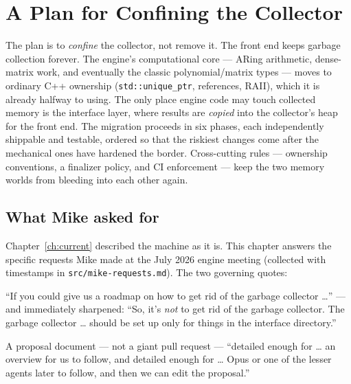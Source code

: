 \documentclass[11pt,oneside]{report}
\newcommand{\code}[1]{\textcolor{m2code}{\texttt{#1}}}
\newcommand{\file}[1]{\textcolor{m2file}{\texttt{#1}}}
\begin{document}
\chapter{A Plan for Confining the Collector}
\label{ch:plan}
\begin{inbrief}
The plan is to \emph{confine} the collector, not remove it. The front end
keeps garbage collection forever. The engine's computational core ---
ARing arithmetic, dense-matrix work, and eventually the classic
polynomial/matrix types --- moves to ordinary C++ ownership
(\code{std::unique\_ptr}, references, RAII), which it is already halfway to
using. The only place engine code may touch collected memory is the interface
layer, where results are \emph{copied} into the collector's heap for the front
end. The migration proceeds in six phases, each independently shippable and
testable, ordered so that the riskiest changes come after the mechanical ones
have hardened the border. Cross-cutting rules --- ownership conventions,
a finalizer policy, and CI enforcement --- keep the two memory worlds from
bleeding into each other again.
\end{inbrief}

\section{What Mike asked for}
\label{sec:asked}

Chapter~\ref{ch:current} described the machine as it is. This chapter answers
the specific requests Mike made at the July 2026 engine meeting (collected
with timestamps in \file{src/mike-requests.md}). The two governing quotes:

\begin{mikesays}
``If you could give us a roadmap on how to get rid of the garbage collector
\ldots'' --- and immediately sharpened: ``So, it's \emph{not} to get rid of
the garbage collector. The garbage collector \ldots{} should be set up only
for things in the interface directory.''
\end{mikesays}

\begin{mikesays}
A proposal document --- not a giant pull request --- ``detailed enough for
\ldots{} an overview for us to follow, and detailed enough for \ldots{} Opus
or one of the lesser agents later to follow, and then we can edit the
proposal.''
\end{mikesays}
\end{document}
